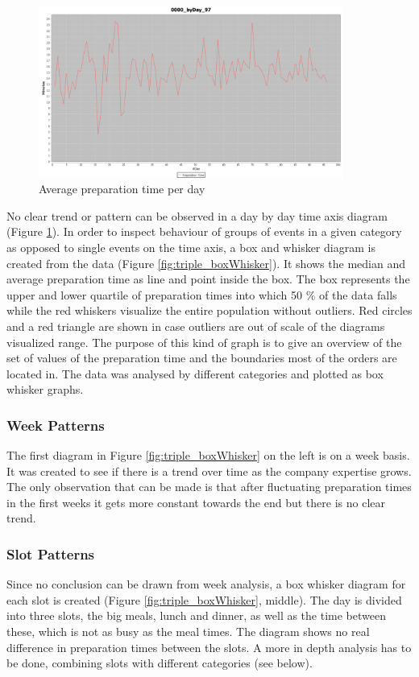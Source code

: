 \begin{figure}[h]
\begin{center}
\includegraphics[width=10cm]{images/0000_byDay_97.png}
\caption{Average preparation time per day}
\label{fig:0000_byDay_97}
\end{center}
\end{figure}


No clear trend or pattern can be observed in a day by day time axis diagram (Figure \ref{fig:0000_byDay_97}). In order to inspect behaviour of groups of events in a given category as opposed to single events on the time axis, a box and whisker diagram is created from the data (Figure \ref{fig:triple_boxWhisker}). It shows the median and average preparation time as line and point inside the box. The box represents the upper and lower quartile of preparation times into which 50 \% of the data falls while the red whiskers visualize the entire population without outliers. Red circles and a red triangle are shown in case outliers are out of scale of the diagrams visualized range. The purpose of this kind of graph is to give an overview of the set of values of the preparation time and the boundaries most of the orders are located in. The data was analysed by different categories and plotted as box whisker graphs.\newline
\subsubsection{Week Patterns}
The first diagram in Figure \ref{fig:triple_boxWhisker} on the left is on a week basis. It was created to see if there is a trend over time as the company expertise grows. The only observation that can be made is that after fluctuating preparation times in the first weeks it gets more constant towards the end but there is no clear trend.
\subsubsection{Slot Patterns}
Since no conclusion can be drawn from week analysis, a box whisker diagram for each slot is created (Figure \ref{fig:triple_boxWhisker}, middle). The day is divided into three slots, the big meals, lunch and dinner, as well as the time between these, which is not as busy as the meal times. The diagram shows no real difference in preparation times between the slots. A more in depth analysis has to be done, combining slots with different categories (see below).
